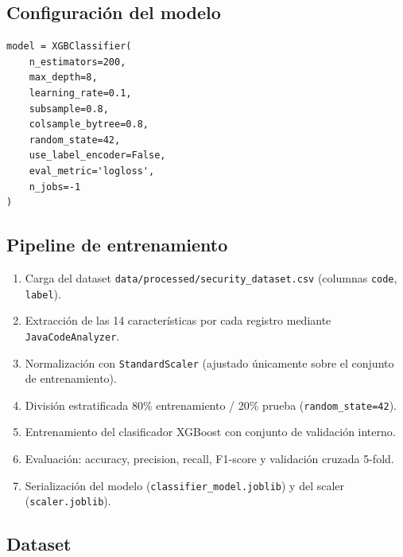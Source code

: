 \documentclass[12pt,a4paper]{article}
\begin{document}
\subsection{Configuración del modelo}

\begin{lstlisting}[style=python, caption={Configuración del clasificador XGBoost}]
model = XGBClassifier(
    n_estimators=200,
    max_depth=8,
    learning_rate=0.1,
    subsample=0.8,
    colsample_bytree=0.8,
    random_state=42,
    use_label_encoder=False,
    eval_metric='logloss',
    n_jobs=-1
)
\end{lstlisting}

\subsection{Pipeline de entrenamiento}

\begin{enumerate}
  \item Carga del dataset \texttt{data/processed/security\_dataset.csv} (columnas \texttt{code}, \texttt{label}).
  \item Extracción de las 14 características por cada registro mediante \texttt{JavaCodeAnalyzer}.
  \item Normalización con \texttt{StandardScaler} (ajustado únicamente sobre el conjunto de entrenamiento).
  \item División estratificada 80\% entrenamiento / 20\% prueba (\texttt{random\_state=42}).
  \item Entrenamiento del clasificador XGBoost con conjunto de validación interno.
  \item Evaluación: accuracy, precision, recall, F1-score y validación cruzada 5-fold.
  \item Serialización del modelo (\texttt{classifier\_model.joblib}) y del scaler (\texttt{scaler.joblib}).
\end{enumerate}

\subsection{Dataset}
\end{document}
